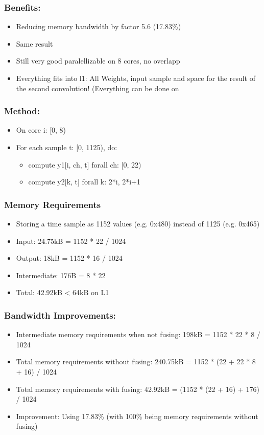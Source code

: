 \documentclass[11pt]{article}
\begin{document}
\subsubsection{Benefits:}
\label{sec:orgf41aaee}
\begin{itemize}
\item Reducing memory bandwidth by factor 5.6 (17.83\%)
\item Same result
\item Still very good paralellizable on 8 cores, no overlapp
\item Everything fits into l1: All Weights, input sample and space for the result of the second convolution! (Everything can be done on
\end{itemize}
\subsubsection{Method:}
\label{sec:org4cfac08}
\begin{itemize}
\item On core i: [0, 8)
\item For each sample t: [0, 1125), do:
\begin{itemize}
\item compute y1[i, ch, t] forall ch: [0, 22)
\item compute y2[k, t] forall k: 2*i, 2*i+1
\end{itemize}
\end{itemize}
\subsubsection{Memory Requirements}
\label{sec:org97f12f0}
\begin{itemize}
\item Storing a time sample as 1152 values (e.g. 0x480) instead of 1125 (e.g. 0x465)
\item Input: 24.75kB = 1152 * 22 / 1024
\item Output: 18kB = 1152 * 16 / 1024
\item Intermediate: 176B = 8 * 22
\item Total: 42.92kB < 64kB on L1
\end{itemize}
\subsubsection{Bandwidth Improvements:}
\label{sec:org65805e3}
\begin{itemize}
\item Intermediate memory requirements when not fusing: 198kB = 1152 * 22 * 8 / 1024
\item Total memory requirements without fusing: 240.75kB = 1152 * (22 + 22 * 8 + 16) / 1024
\item Total memory requirements with fusing: 42.92kB = (1152 * (22 + 16) + 176) / 1024
\item Improvement: Using 17.83\% (with 100\% being memory requirements without fusing)
\end{itemize}
\end{document}
